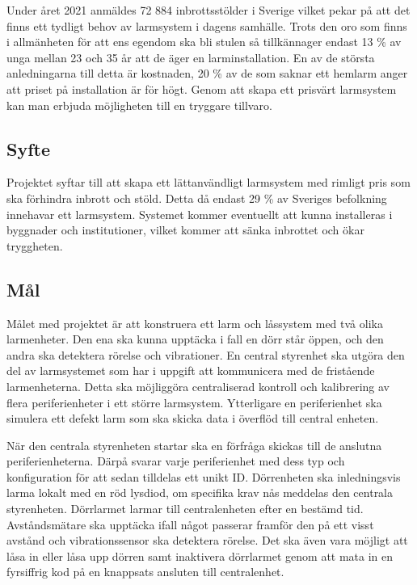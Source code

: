 \documentclass{article}
\begin{document}
Under året 2021 anmäldes 72 884 inbrottsstölder i Sverige vilket pekar på att det finns ett tydligt behov av larmsystem i dagens samhälle.\cite{BRa} Trots den oro som finns i allmänheten för att ens egendom ska bli stulen så tillkännager endast 13 \% av unga mellan 23 och 35 år att de äger en larminstallation.\cite{MoFor} En av de största anledningarna till detta är kostnaden, 20 \% av de som saknar ett hemlarm anger att priset på installation är för högt.\cite{MoFor} Genom att skapa ett prisvärt larmsystem kan man erbjuda möjligheten till en tryggare tillvaro.


\subsection{Syfte}
Projektet syftar till att skapa ett lättanvändligt larmsystem med rimligt pris som ska förhindra inbrott och stöld. Detta då endast 29 \% av Sveriges befolkning innehavar ett larmsystem.\cite{SSF} Systemet kommer eventuellt att kunna installeras i byggnader och institutioner, vilket kommer att sänka inbrottet och ökar tryggheten.


\subsection{Mål}
Målet med projektet är att konstruera ett larm och låssystem med två olika larmenheter. Den ena ska kunna upptäcka i fall en dörr står öppen, och den andra ska detektera rörelse och vibrationer. 
En central styrenhet ska utgöra den del av larmsystemet som har i uppgift att kommunicera med de fristående larmenheterna.
Detta ska möjliggöra centraliserad kontroll och kalibrering av flera periferienheter i ett större larmsystem.
Ytterligare en periferienhet ska simulera ett defekt larm som ska skicka data i överflöd till central enheten.

När den centrala styrenheten startar ska en förfråga skickas till de anslutna periferienheterna. Därpå svarar varje periferienhet med dess typ och konfiguration för att sedan tilldelas ett unikt ID. Dörrenheten ska inledningsvis larma lokalt med en röd lysdiod, om specifika krav nås meddelas den centrala styrenheten. Dörrlarmet larmar till centralenheten efter en bestämd tid. Avståndsmätare ska upptäcka ifall något passerar framför den på ett visst avstånd och vibrationssensor ska detektera rörelse. Det ska även vara möjligt att låsa in eller låsa upp dörren samt inaktivera dörrlarmet genom att mata in en fyrsiffrig kod på en knappsats ansluten till centralenhet.
\end{document}
